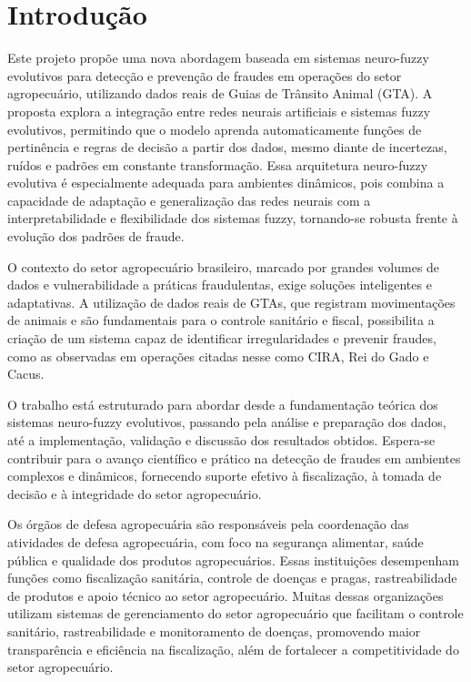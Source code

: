 
\chapter{Introdução}
\label{chap:Introdução}

Este projeto propõe uma nova abordagem baseada em sistemas neuro-fuzzy evolutivos para detecção e prevenção de fraudes em operações do setor agropecuário, utilizando dados reais de Guias de Trânsito Animal (GTA). A proposta explora a integração entre redes neurais artificiais e sistemas fuzzy evolutivos, permitindo que o modelo aprenda automaticamente funções de pertinência e regras de decisão a partir dos dados, mesmo diante de incertezas, ruídos e padrões em constante transformação. Essa arquitetura neuro-fuzzy evolutiva é especialmente adequada para ambientes dinâmicos, pois combina a capacidade de adaptação e generalização das redes neurais com a interpretabilidade e flexibilidade dos sistemas fuzzy, tornando-se robusta frente à evolução dos padrões de fraude.

O contexto do setor agropecuário brasileiro, marcado por grandes volumes de dados e vulnerabilidade a práticas fraudulentas, exige soluções inteligentes e adaptativas. A utilização de dados reais de GTAs, que registram movimentações de animais e são fundamentais para o controle sanitário e fiscal, possibilita a criação de um sistema capaz de identificar irregularidades e prevenir fraudes, como as observadas em operações citadas nesse como CIRA, Rei do Gado e Cacus.

O trabalho está estruturado para abordar desde a fundamentação teórica dos sistemas neuro-fuzzy evolutivos, passando pela análise e preparação dos dados, até a implementação, validação e discussão dos resultados obtidos. Espera-se contribuir para o avanço científico e prático na detecção de fraudes em ambientes complexos e dinâmicos, fornecendo suporte efetivo à fiscalização, à tomada de decisão e à integridade do setor agropecuário.

Os órgãos de defesa agropecuária são responsáveis pela coordenação das atividades de defesa agropecuária, com foco na segurança alimentar, saúde pública e qualidade dos produtos agropecuários. Essas instituições desempenham funções como fiscalização sanitária, controle de doenças e pragas, rastreabilidade de produtos e apoio técnico ao setor agropecuário. Muitas dessas organizações utilizam sistemas de gerenciamento do setor agropecuário que facilitam o controle sanitário, rastreabilidade e monitoramento de doenças, promovendo maior transparência e eficiência na fiscalização, além de fortalecer a competitividade do setor agropecuário. 

